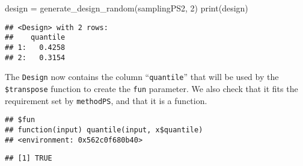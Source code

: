 \documentclass[
]{scrbook}
\newenvironment{Shaded}{\begin{snugshade}}{\end{snugshade}}
\newcommand{\DecValTok}[1]{\textcolor[rgb]{0.00,0.00,0.81}{#1}}
\newcommand{\FunctionTok}[1]{\textcolor[rgb]{0.00,0.00,0.00}{#1}}
\newcommand{\NormalTok}[1]{#1}
\newcommand{\OtherTok}[1]{\textcolor[rgb]{0.56,0.35,0.01}{#1}}
\newcommand{\SpecialCharTok}[1]{\textcolor[rgb]{0.00,0.00,0.00}{#1}}
\renewenvironment{Shaded} {\begin{snugshade}\small} {\end{snugshade}}
\begin{document}
\begin{Shaded}
\begin{Highlighting}[]
\NormalTok{design }\OtherTok{=} \FunctionTok{generate\_design\_random}\NormalTok{(samplingPS2, }\DecValTok{2}\NormalTok{)}
\FunctionTok{print}\NormalTok{(design)}
\end{Highlighting}
\end{Shaded}

\begin{verbatim}
## <Design> with 2 rows:
##    quantile
## 1:   0.4258
## 2:   0.3154
\end{verbatim}

The \texttt{Design} now contains the column ``\texttt{quantile}'' that will be used by the \texttt{\$transpose} function to create the \texttt{fun} parameter.
We also check that it fits the requirement set by \texttt{methodPS}, and that it is a function.

\begin{Shaded}
\end{Shaded}

\begin{verbatim}
## $fun
## function(input) quantile(input, x$quantile)
## <environment: 0x562c0f680b40>
\end{verbatim}

\begin{Shaded}
\end{Shaded}

\begin{verbatim}
## [1] TRUE
\end{verbatim}

\begin{Shaded}
\end{Shaded}
\end{document}
